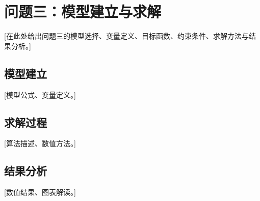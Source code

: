 \section{问题三：模型建立与求解}

[在此处给出问题三的模型选择、变量定义、目标函数、约束条件、求解方法与结果分析。]

\subsection{模型建立}

[模型公式、变量定义。]

\subsection{求解过程}

[算法描述、数值方法。]

\subsection{结果分析}

[数值结果、图表解读。]
